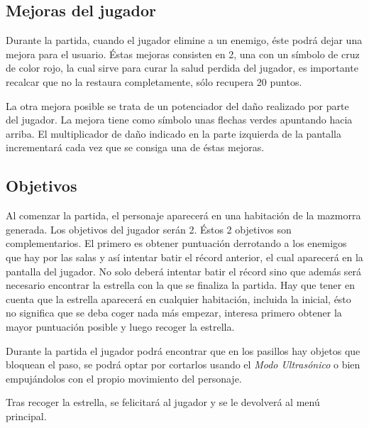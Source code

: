 \subsection{Mejoras del jugador}

Durante la partida, cuando el jugador elimine a un enemigo, éste podrá dejar una mejora para el usuario. Éstas mejoras consisten en 2, una con un símbolo de cruz de color rojo, la cual sirve para curar la salud perdida del jugador, es importante recalcar que no la restaura completamente, sólo recupera 20 puntos. 

La otra mejora posible se trata de un potenciador del daño realizado por parte del jugador. La mejora tiene como símbolo unas flechas verdes apuntando hacia arriba. El multiplicador de daño indicado en la parte izquierda de la pantalla incrementará cada vez que se consiga una de éstas mejoras.

\subsection{Objetivos}

Al comenzar la partida, el personaje aparecerá en una habitación de la mazmorra generada. Los objetivos del jugador serán 2. Éstos 2 objetivos son complementarios. El primero es obtener puntuación derrotando a los enemigos que hay por las salas y así intentar batir el récord anterior, el cual aparecerá en la pantalla del jugador. No solo deberá intentar batir el récord sino que además será necesario encontrar la estrella con la que se finaliza la partida. Hay que tener en cuenta que la estrella aparecerá en cualquier habitación, incluida la inicial, ésto no significa que se deba coger nada más empezar, interesa primero obtener la mayor puntuación posible y luego recoger la estrella.

Durante la partida el jugador podrá encontrar que en los pasillos hay objetos que bloquean el paso, se podrá optar por cortarlos usando el \textit{Modo Ultrasónico} o bien empujándolos con el propio movimiento del personaje.

Tras recoger la estrella, se felicitará al jugador y se le devolverá al menú principal.

